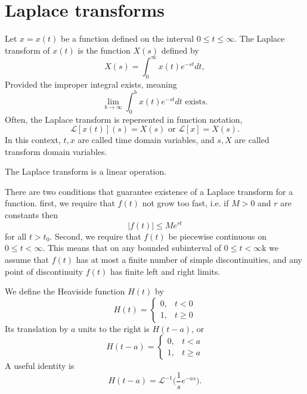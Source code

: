 \documentclass[nobib,notoc]{tufte-handout}
\begin{document}
\section{Laplace transforms}
\begin{defi}
	Let \(x=x(t)\) be a function defined on the interval \(0\leq t\leq\infty\). The Laplace transform of \(x(t)\) is the function \(X(s)\) defined by
	\begin{equation*}
		X(s)=\int_0^\infty x(t)e^{-st}dt,
	\end{equation*}
	Provided the improper integral exists, meaning
	\begin{equation*}
		\lim_{b\rightarrow\infty}\int_{0}^{b}x(t)e^{-st}dt\text{ exists.}
	\end{equation*}
	Often, the Laplace transform is repersented in function notation,
	\begin{equation*}
		\mathcal{L}[x(t)](s)=X(s)\text{ or }\mathcal{L}[x]=X(s).
	\end{equation*}
	In this context, \(t,x\) are called time domain variables, and \(s,X\) are called transform domain variables.
\end{defi}
\begin{thm}
	The Laplace transform is a linear operation.
\end{thm}
\begin{rema}
	There are two conditions that guarantee existence of a Laplace transform for a function. first, we require that \(f(t)\) not grow too fast, i.e. if \(M>0\) and \(r\) are constants then
	\begin{equation*}
		\lvert f(t)\rvert\leq Me^{rt}
	\end{equation*}
	for all \(t>t_0\). Second, we require that \(f(t)\) be piecewise continuous on \(0\leq t<\infty\). This means that on any bounded subinterval of \(0\leq t<\infty\)k we assume that \(f(t)\) has at most a finite number of simple discontinuities, and any point of discontinuity \(f(t)\) has finite left and right limits.
\end{rema}
\begin{defi}
	We define the Heaviside function \(H(t)\) by
	\begin{equation*}
		H(t)=\begin{cases}0,&t<0\\1,&t\geq 0\end{cases}
	\end{equation*}
	Its translation by \(a\) units to the right is \(H(t-a)\), or
	\begin{equation*}
		H(t-a)=\begin{cases}0,&t<a\\1,&t\geq a\end{cases}
	\end{equation*}
	A useful identity is
	\begin{equation*}
		H(t-a)=\mathcal{L}^{-1}\big(\frac{1}{s}e^{-as}\big).
	\end{equation*}
\end{defi}
\end{document}
